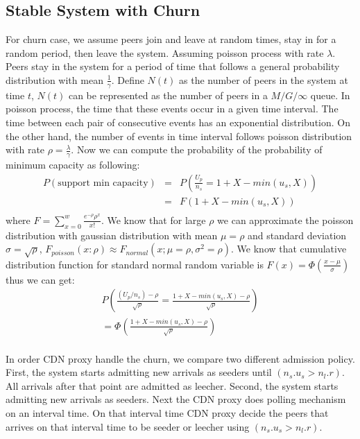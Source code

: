 \documentclass[paper]{ieice}
\begin{document}
\subsection{Stable System with Churn}\label{sec:stablesystemwithchurn}
For churn case, we assume peers join and leave at random times, stay in for a random period, then leave the system.
Assuming poisson process with rate $\lambda$. 
Peers stay in the system for a period of time that follows a general probability distribution with mean $\frac{1}{\gamma}$.
Define $N(t)$ as the number of peers in the system at time $t$, $N(t)$ can be represented as the number of peers in a $M/G/\infty$ queue.
In poisson process, the time that these events occur in a given time interval. 
The time between each pair of consecutive events has an exponential distribution.
On the other hand, the number of events in time interval follows poisson distribution with rate $\rho = \frac{\lambda}{\gamma}$.
Now we can compute the probability of the probability of minimum capacity as following:
\begin{eqnarray*}
P(\text{support min capacity}) &=& P(\frac{U_p}{n_s} = 1+X-min(u_s,X))\\
&=&F(1+X-min(u_s,X))\\
\end{eqnarray*}
where $F=\sum_{x=0}^{w} \frac{e^{-\rho} \rho^{x}}{x!}$.
We know that for large $\rho$ we can approximate the poisson distribution with gaussian distribution with mean $\mu=\rho$ and standard deviation $\sigma = \sqrt{\rho}$, $F_{poisson}(x:\rho) \approx F_{normal}(x;\mu=\rho, \sigma^{2}=\rho)$.
We know that cumulative distribution function for standard normal random variable is $F(x) = \Phi(\frac{x-\mu}{\sigma})$ thus we can get:
\begin{eqnarray*}
P \left(\frac{(U_p/n_s) - \rho}{\sqrt{\rho}}=\frac{1+X-min(u_s,X) - \rho}{\sqrt{\rho}}\right)\\
=\Phi \left( \frac{1+X-min(u_s,X) - \rho}{\sqrt{\rho}} \right) \\
\end{eqnarray*}

In order CDN proxy handle the churn, we compare two different admission policy. 
First, the system starts admitting new arrivals as seeders until $(n_s.u_s > n_l.r)$. 
All arrivals after that point are admitted as leecher.     
Second, the system starts admitting new arrivals as seeders. 
Next the CDN proxy does polling mechanism on an interval time.
On that interval time CDN proxy decide the peers that arrives on that interval time to be seeder or leecher using $(n_s.u_s > n_l.r)$.
\end{document}
